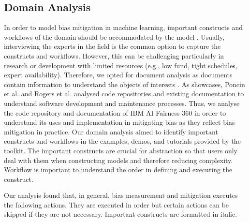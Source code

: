 \documentclass[sigconf,review]{acmart}
\begin{document}


\subsection{Domain Analysis}
\label{sec:domain_analysis}

In order to model bias mitigation in machine learning, important constructs and workflows of the domain should be accommodated by the model \cite{volter2013model}. Usually, interviewing the experts in the field is the common option to capture the constructs and workflows. However, this can be challenging particularly in research or development with limited resources (e.g., low fund, tight schedules, expert availability). Therefore, we opted for document analysis as documents contain information to understand the objects of interests \cite{bowen2009document}. As showcases, Poncin et al. \cite{poncin2011process} and Rogers et al. \cite{rogers2015using} analysed code repositories and existing documentation to understand software development and maintenance processes. Thus, we analyse the code repository and documentation of IBM AI Fairness 360 in order to understand its uses and implementation in mitigating bias as they reflect bias mitigation in practice. Our domain analysis aimed to identify important constructs and workflows in the examples, demos, and tutorials provided by the toolkit. The important constructs are crucial for abstraction so that users only deal with them when constructing models and therefore reducing complexity. Workflow is important to understand the order in defining and executing the construct.


Our analysis found that, in general, bias measurement and mitigation  executes the following actions. They are executed in order but certain actions can be skipped if they are not necessary. Important constructs are formatted in italic.
\end{document}

